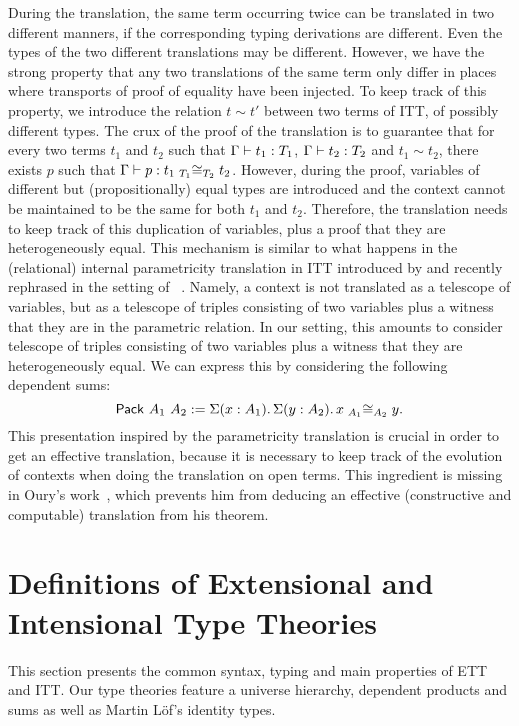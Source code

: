 During the translation, the same term occurring twice can be
translated in two different manners, if the corresponding typing
derivations are different. Even the types of the two different
translations may be different.
%
However, we have the strong property that any two translations of the
same term only differ in places where transports of proof of equality have been
injected.
%
To keep track of this property, we introduce the relation $t \sim t'$
between two terms of ITT, of possibly different types.
%
The crux of the proof of the translation is to guarantee that for
every two terms $t_1$ and $t_2$ such that $\isterm{\Ga}{t_1}{T_1}$,
  $\isterm{\Ga}{t_2}{T_2}$ and $t_1 \sim t_2$, there exists $p$ such
  that
  $\isterm{\Ga} {p} {\Heq{{T_1}} {{t_1}} {{T_2}} {{t_2}}}$.
%
However, during the proof, variables of different but (propositionally) equal
types are introduced and the context cannot be maintained to be the same
for both $t_1$ and $t_2$. Therefore, the translation needs to keep
track of this duplication of variables, plus a proof that they are
heterogeneously equal.
%
This mechanism is similar to what happens in the (relational) internal
parametricity translation in ITT introduced by
\cite{bernardy2012proofs} and recently rephrased in the setting of
\TemplateCoq~\cite{DBLP:conf/itp/AnandBCST18}. Namely, a context is not
translated as a telescope of variables, but as a telescope of triples
consisting of two variables plus a witness that they are in the
parametric relation.
%
In our setting, this amounts to consider telescope of triples
consisting of two variables plus a witness that they are
heterogeneously equal. We can express this by considering the
following dependent sums:
\[
\Pack{A_1}{A_2} := \Sum{x:A_1} \Sum{y:A_2} \Heq{A_1}{x}{A_2}{y}.
\]
%
This presentation inspired by the parametricity translation is crucial
in order to get an effective translation, because it is necessary to
keep track of the evolution of contexts when doing the translation on
open terms.
%
This ingredient is missing in Oury's work~\cite{oury2005extensionality},
which prevents him from deducing an effective (\ie constructive and
computable) translation from his theorem.

\section{Definitions of Extensional and Intensional Type Theories}
\label{sec:syntax-features}

This section presents the common syntax, typing and main properties of
ETT and ITT. Our type theories feature a universe hierarchy, dependent
products and sums as well as Martin Löf's identity types.

